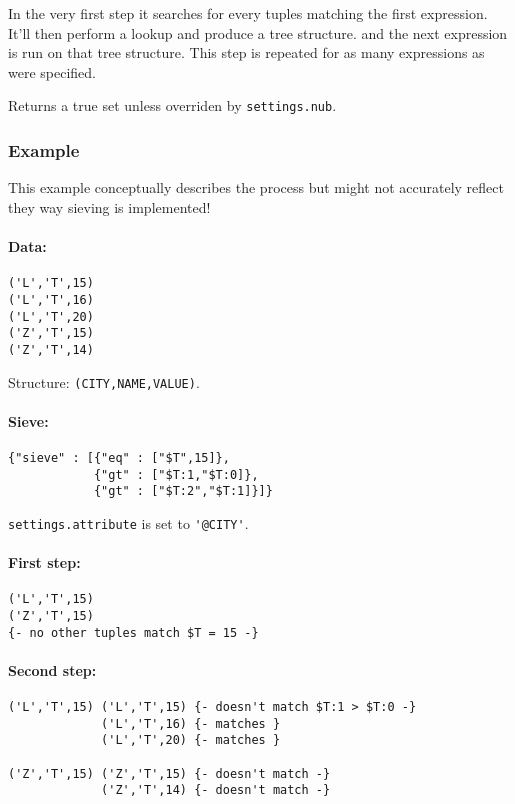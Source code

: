 \documentclass[a4paper]{article}
\begin{document}
In the very first step it searches for every tuples matching the first
expression. It'll then perform a lookup and produce a tree structure.
and the next expression is run on that tree structure. This step is
repeated for as many expressions as were specified.

Returns a true set unless overriden by \verb|settings.nub|.

\subsubsection{Example}

This example conceptually describes the process but might not
accurately reflect they way sieving is implemented!

\paragraph*{Data:} 

\begin{verbatim}
('L','T',15)
('L','T',16)
('L','T',20)
('Z','T',15)
('Z','T',14)
\end{verbatim}

Structure: \verb|(CITY,NAME,VALUE)|.

\paragraph*{Sieve:}

\begin{verbatim}
{"sieve" : [{"eq" : ["$T",15]},
            {"gt" : ["$T:1,"$T:0]},
            {"gt" : ["$T:2","$T:1]}]}
\end{verbatim}

\verb|settings.attribute| is set to \verb|'@CITY'|.

\paragraph*{First step:}

\begin{verbatim}
('L','T',15)
('Z','T',15)
{- no other tuples match $T = 15 -}
\end{verbatim}

\paragraph*{Second step:}

\begin{verbatim}
('L','T',15) ('L','T',15) {- doesn't match $T:1 > $T:0 -}
             ('L','T',16) {- matches }
             ('L','T',20) {- matches }

('Z','T',15) ('Z','T',15) {- doesn't match -}
             ('Z','T',14) {- doesn't match -}
\end{verbatim}
\end{document}
